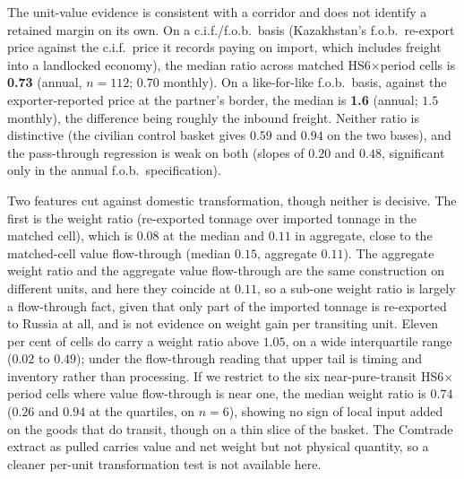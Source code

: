 \documentclass[12pt]{article}
\begin{document}
The unit-value evidence is consistent with a corridor and does not identify a retained margin
on its own. On a c.i.f./f.o.b.\ basis (Kazakhstan's f.o.b.\ re-export price against the
c.i.f.\ price it records paying on import, which includes freight into a landlocked
economy), the median ratio across matched HS6$\times$period cells is \textbf{0.73} (annual,
$n = 112$; $0.70$ monthly). On a like-for-like f.o.b.\ basis, against the exporter-reported
price at the partner's border, the median is \textbf{1.6} (annual; $1.5$ monthly), the
difference being roughly the inbound freight. Neither ratio is distinctive (the civilian
control basket gives $0.59$ and $0.94$ on the two bases), and the pass-through regression is
weak on both (slopes of $0.20$ and $0.48$, significant only in the annual f.o.b.\
specification).

Two features cut against domestic transformation, though neither is decisive. The first is the
weight ratio (re-exported tonnage over imported tonnage in the matched cell), which is
$0.08$ at the median and $0.11$ in aggregate, close to the matched-cell value flow-through
(median $0.15$, aggregate $0.11$). The aggregate weight ratio and the aggregate value
flow-through are the same construction on different units, and here they coincide at $0.11$, so a
sub-one weight ratio is largely a flow-through fact, given that only part of the imported
tonnage is re-exported to Russia at all, and is not evidence on weight gain per transiting
unit. Eleven per
cent of cells do carry a weight ratio above $1.05$, on a wide interquartile range ($0.02$ to
$0.49$); under the flow-through reading that upper tail is timing and inventory rather than
processing. If we restrict to the six near-pure-transit HS6$\times$period cells where value
flow-through is near one, the median weight ratio is $0.74$ ($0.26$ and $0.94$ at the
quartiles, on $n = 6$), showing no sign of local input added on the goods that do transit,
though on a thin slice of the basket. The
Comtrade extract as pulled carries value and net weight but not physical quantity, so a
cleaner per-unit transformation test is not available here.
\end{document}
